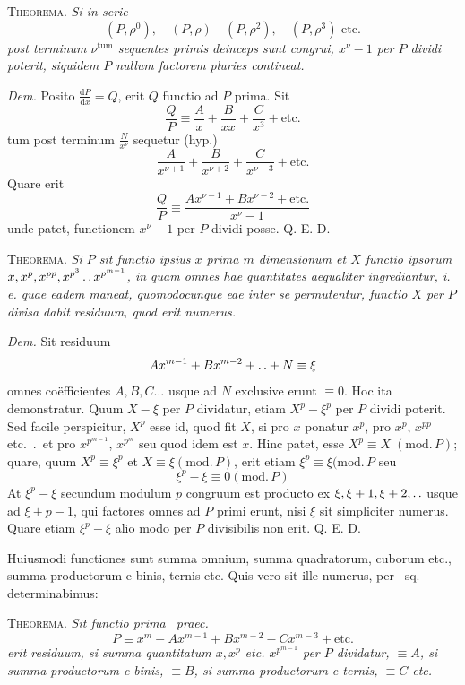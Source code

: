 \textsc{Theorema.} \emph{Si in serie}
\[
(P,\rho^0),\quad(P,\rho)\quad(P,\rho^2),\quad(P,\rho^3)\text{ etc.}
\]
\emph{post terminum $\nu^{\mathrm{tum}}$ sequentes primis deinceps sunt congrui, $x^\nu-1$ per $P$ dividi poterit, siquidem $P$ nullum factorem pluries contineat.}

\emph{Dem.} Posito $\frac{\mathrm{d}P}{\mathrm{d}x}=Q$, erit $Q$ functio ad $P$ prima. Sit
\[
\frac QP\equiv\frac Ax+\frac B{xx}+\frac C{x^3}+\text{etc.}
\]
tum post terminum $\frac N{x^\nu}$ sequetur (hyp.)
\[
\frac A{x^{\nu+1}}+\frac B{x^{\nu+2}}+\frac C{x^{\nu+3}}+\text{etc.}
\]
Quare erit
\[
\frac QP\equiv\frac{Ax^{\nu-1}+Bx^{\nu-2}+\text{etc.}}{x^\nu-1}
\]
unde patet, functionem $x^\nu-1$ per $P$ dividi posse. Q. E. D.

\textsc{Theorema.} \emph{Si $P$ sit functio ipsius $x$ prima $m$ dimensionum et $X$ functio ipsorum $x,x^p,x^{pp},x^{p^3}\mathinner{.\,.} x^{p^{m-1}}$, in quam omnes hae quantitates aequaliter ingrediantur, i. e. quae eadem maneat, quomodocunque eae inter se permutentur, functio $X$ per $P$ divisa dabit residuum, quod erit numerus.}

\emph{Dem.} Sit residuum
\[
Ax^{m-1}+Bx^{m-2}+\mathinner{.\,.}+N\equiv\xi
\]
omnes coëfficientes $A,B,C\ldots$ usque ad $N$ exclusive erunt $\equiv0$. Hoc ita demonstratur. Quum $X-\xi$ per $P$ dividatur, etiam $X^p-\xi^p$ per $P$ dividi 
%
poterit. Sed facile perspicitur, $X^p$ esse id, quod fit $X$, si pro $x$ ponatur $x^p$, pro $x^p$, $x^{pp}$ etc.\ .\ et pro $x^{p^{m-1}}$, $x^{p^m}$ seu quod idem est $x$. Hinc patet, esse $X^p\equiv X\;(\mathrm{mod.}\,P)$; quare, quum $X^p\equiv\xi^p$ et $X\equiv\xi(\mathrm{mod.}\,P)$, erit etiam $\xi^p\equiv\xi(\mathrm{mod.}\,P$ seu
\[
\xi^p-\xi\equiv0(\mathrm{mod.}\,P)
\]
At $\xi^p-\xi$ secundum modulum $p$ congruum est producto ex $\xi,\xi+1,\xi+2,\mathinner{.\,.}$ usque ad $\xi+p-1$, qui factores omnes ad $P$ primi erunt, nisi $\xi$ sit simpliciter numerus. Quare etiam $\xi^p-\xi$ alio modo per $P$ divisibilis non erit. Q. E. D.

Huiusmodi functiones sunt summa omnium, summa quadratorum, cuborum etc., summa productorum e binis, ternis etc. Quis vero sit ille numerus, per \textsection\ sq. determinabimus:

\textsc{Theorema.} \emph{Sit functio prima \textsection\ praec.}
\[
P\equiv x^m-Ax^{m-1}+Bx^{m-2}-Cx^{m-3}+\text{etc.}
\]
\emph{erit residuum, si summa quantitatum $x,x^p$ etc. $x^{p^{m-1}}$ per $P$ dividatur, $\equiv A$, si summa productorum e binis, $\equiv B$, si summa productorum e ternis, $\equiv C$ etc.}

